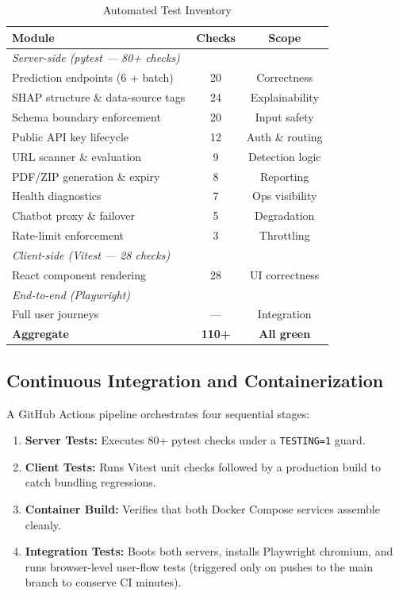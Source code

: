 \documentclass[conference]{IEEEtran}
\begin{document}
\begin{table}[htbp]
\caption{Automated Test Inventory}
\label{tab:tests}
\centering
\begin{tabular}{lcc}
\toprule
\textbf{Module} & \textbf{Checks} & \textbf{Scope} \\
\midrule
\multicolumn{3}{l}{\textit{Server-side (pytest --- 80+ checks)}} \\
Prediction endpoints (6 + batch) & 20 & Correctness \\
SHAP structure \& data-source tags & 24 & Explainability \\
Schema boundary enforcement & 20 & Input safety \\
Public API key lifecycle & 12 & Auth \& routing \\
URL scanner \& evaluation & 9 & Detection logic \\
PDF/ZIP generation \& expiry & 8 & Reporting \\
Health diagnostics & 7 & Ops visibility \\
Chatbot proxy \& failover & 5 & Degradation \\
Rate-limit enforcement & 3 & Throttling \\
\midrule
\multicolumn{3}{l}{\textit{Client-side (Vitest --- 28 checks)}} \\
React component rendering & 28 & UI correctness \\
\midrule
\multicolumn{3}{l}{\textit{End-to-end (Playwright)}} \\
Full user journeys & --- & Integration \\
\midrule
\textbf{Aggregate} & \textbf{110+} & \textbf{All green} \\
\bottomrule
\end{tabular}
\end{table}

\subsection{Continuous Integration and Containerization}

A GitHub Actions pipeline orchestrates four sequential stages:

\begin{enumerate}
    \item \textbf{Server Tests:} Executes 80+ pytest checks under a \texttt{TESTING=1} guard.
    \item \textbf{Client Tests:} Runs Vitest unit checks followed by a production build to catch bundling regressions.
    \item \textbf{Container Build:} Verifies that both Docker Compose services assemble cleanly.
    \item \textbf{Integration Tests:} Boots both servers, installs Playwright chromium, and runs browser-level user-flow tests (triggered only on pushes to the main branch to conserve CI minutes).
\end{enumerate}
\end{document}
